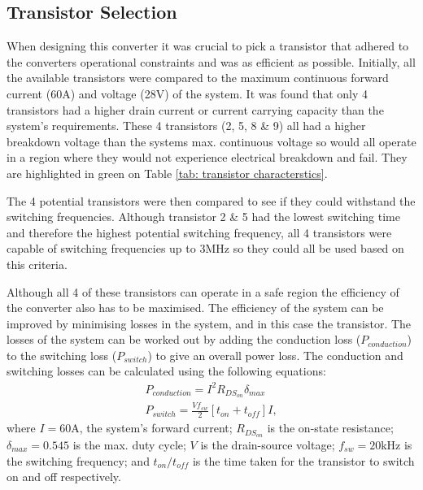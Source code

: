     \subsection{Transistor Selection}
        When designing this converter it was crucial to pick a transistor that adhered to the converters operational constraints and was as efficient as possible. Initially, all the available transistors were compared to the maximum continuous forward current (60A) and voltage (28V) of the system. It was found that only 4 transistors had a higher drain current or current carrying capacity than the system's requirements. These 4 transistors (2, 5, 8 \& 9) all had a higher breakdown voltage than the systems max. continuous voltage so would all operate in a region where they would not experience electrical breakdown and fail. They are highlighted in green on Table \ref{tab: transistor characterstics}.
        

        The 4 potential transistors were then compared to see if they could withstand the switching frequencies. Although transistor 2 \& 5 had the lowest switching time and therefore the highest potential switching frequency, all 4 transistors were capable of switching frequencies up to 3MHz so they could all be used based on this criteria.
        
        Although all 4 of these transistors can operate in a safe region the efficiency of the converter also has to be maximised. The efficiency of the system can be improved by minimising losses in the system, and in this case the transistor. The losses of the system can be worked out by adding the conduction loss (\(P_{conduction}\)) to the switching loss (\(P_{switch}\)) to give an overall power loss. The conduction and switching losses can be calculated using the following equations: 
        \begin{gather}
            P_{conduction} = I^2R_{DS_{on}} \delta_{max} \label{conduction loss} \\ P_{switch} = \frac{V f_{sw}}{2} [t_{on} + t_{off}] I, \label{switching loss}
        \end{gather}
        where \(I=60\)A, the system's forward current; \(R_{DS_{on}}\) is the on-state resistance; \(\delta_{max} = 0.545\) is the max. duty cycle; \(V\) is the drain-source voltage; \(f_{sw} = 20\)kHz is the switching frequency; and \(t_{on}/t_{off}\) is the time taken for the transistor to switch on and off respectively.
        
